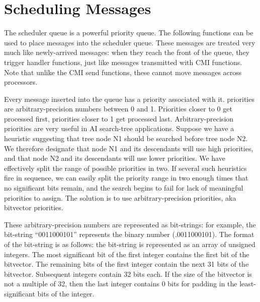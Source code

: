 
\section{Scheduling Messages}
\label{schedqueue}

The scheduler queue is a powerful priority queue.  The following
functions can be used to place messages into the scheduler queue.
These messages are treated very much like newly-arrived messages: when
they reach the front of the queue, they trigger handler functions,
just like messages transmitted with CMI functions.  Note that unlike
the CMI send functions, these cannot move messages across processors.

Every message inserted into the queue has a priority associated with
it.  \converse{} priorities are arbitrary-precision numbers between 0 and
1.  Priorities closer to 0 get processed first, priorities closer to 1
get processed last.  Arbitrary-precision priorities are very useful in
AI search-tree applications. Suppose we have a heuristic suggesting
that tree node N1 should be searched before tree node N2. We therefore
designate that node N1 and its descendants will use high priorities,
and that node N2 and its descendants will use lower priorities. We
have effectively split the range of possible priorities in two. If
several such heuristics fire in sequence, we can easily split the
priority range in two enough times that no significant bits remain,
and the search begins to fail for lack of meaningful priorities to
assign. The solution is to use arbitrary-precision priorities, aka
bitvector priorities.

These arbitrary-precision numbers are represented as bit-strings: for
example, the bit-string ``0011000101'' represents the binary number
(.0011000101).  The format of the bit-string is as follows: the
bit-string is represented as an array of unsigned integers. The most
significant bit of the first integer contains the first bit of the
bitvector.  The remaining bits of the first integer contain the next
31 bits of the bitvector.  Subsequent integers contain 32 bits
each. If the size of the bitvector is not a multiple of 32, then the
last integer contains 0 bits for padding in the least-significant bits
of the integer.

